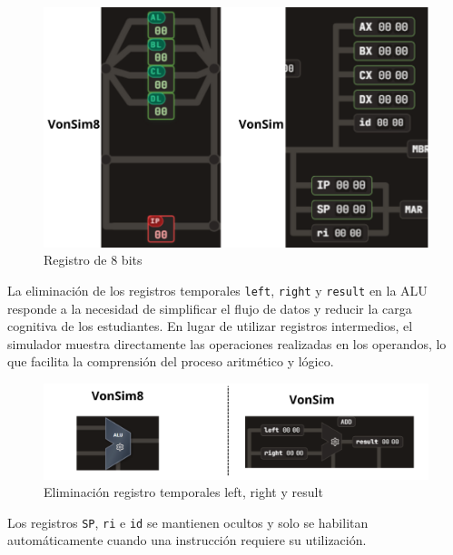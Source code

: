 \documentclass[12pt,oneside]{templates/unerthesis}
\begin{document}
\begin{figure}

{\centering \includegraphics[width=1\linewidth]{images/registros} 

}

\caption{Registro de 8 bits}\label{fig:registros}
\end{figure}

La eliminación de los registros temporales \texttt{left}, \texttt{right} y \texttt{result} en la ALU responde a la necesidad de simplificar el flujo de datos y reducir la carga cognitiva de los estudiantes. En lugar de utilizar registros intermedios, el simulador muestra directamente las operaciones realizadas en los operandos, lo que facilita la comprensión del proceso aritmético y lógico.

\begin{figure}

{\centering \includegraphics[width=1\linewidth]{images/leftrigth} 

}

\caption{Eliminación registro temporales left, right y result}\label{fig:leftrigth}
\end{figure}

Los registros \texttt{SP}, \texttt{ri} e \texttt{id} se mantienen ocultos y solo se habilitan automáticamente cuando una instrucción requiere su utilización.
\end{document}
